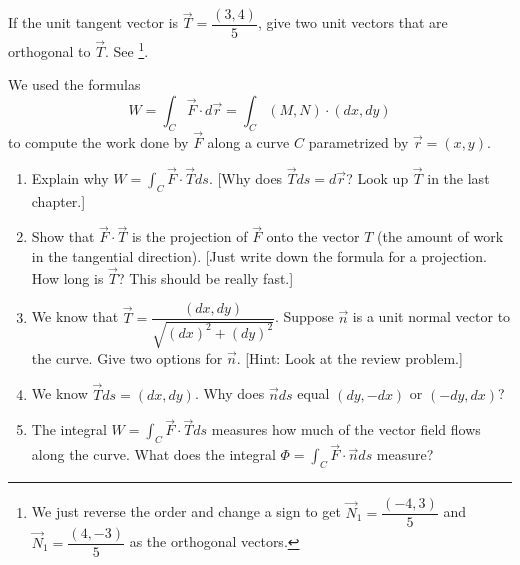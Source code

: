\begin{review*}
 If the unit tangent vector is $\vec T = \dfrac{(3,4)}{5}$, give two unit vectors that are orthogonal to $\vec T$. See \footnote{We just reverse the order and change a sign to get $\vec N_1 = \dfrac{(-4,3)}{5}$ and $\vec N_1 = \dfrac{(4,-3)}{5}$ as the orthogonal vectors.}.  
\end{review*}


\begin{problem}
We used the formulas $$W = \int_C \vec F\cdot d\vec r  = \int_C (M,N)\cdot(dx,dy)$$ to compute the work done by $\vec F$ along a curve $C$ parametrized by $\vec r = (x,y)$. 
\begin{enumerate}
 \item Explain why $W = \int_C \vec F\cdot \vec T ds$. [Why does $\vec T ds = d\vec r$?  Look up $\vec T$ in the last chapter.]
%
 \item Show that $\vec F\cdot \vec T$ is the projection of $\vec F$ onto the vector $T$ (the amount of work in the tangential direction). [Just write down the formula for a projection.  How long is $\vec T$?  This should be really fast.]
 \item 
{}%
We know that $\vec T = \dfrac{(dx, dy)}{\sqrt{(dx)^2+(dy)^2}}$.  Suppose $\vec n$ is a unit normal vector to the curve. Give two options for $\vec n$. [Hint: Look at the review problem.]
 \item We know  $\vec T ds = (dx,dy)$. Why does $\vec n ds$ equal $(dy,-dx)$ or $(-dy,dx)$?
 \item The integral $W = \int_C \vec F\cdot \vec T ds$ measures how much of the vector field flows along the curve.  What does the integral $\Phi = \int_C \vec F\cdot \vec n ds$ measure?
\end{enumerate}

\end{problem}

